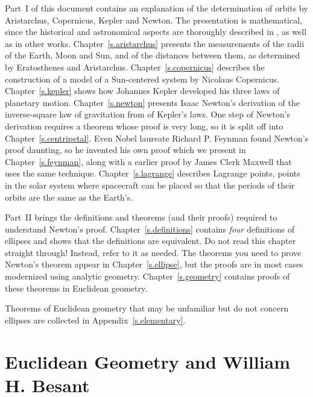 Part~I of this document contains an explanation of the determination of orbits by Aristarchus, Copernicus, Kepler and Newton. The presentation is mathematical, since the historical and astronomical aspects are thoroughly described in \cite{hahn-cic}, as well as in other works. Chapter~\ref{s.aristarchus} presents the measurements of the radii of the Earth, Moon and Sun, and of the distances between them, as determined by Eratosthenes and Aristarchus. Chapter~\ref{s.copernicus} describes the construction of a model of a Sun-centered system by Nicolaus Copernicus. Chapter~\ref{s.kepler} shows how Johannes Kepler developed his three laws of planetary motion. Chapter~\ref{s.newton} presents Isaac Newton's derivation of the inverse-square law of gravitation from of Kepler's laws. One step of Newton's derivation requires a theorem whose proof is very long, so it is split off into Chapter~\ref{s.centripetal}. Even Nobel laureate Richard P. Feynman found Newton's proof daunting, so he invented his own proof which we present in Chapter~\ref{s.feynman}, along with a earlier proof by James Clerk Maxwell that uses the same technique. Chapter~\ref{s.lagrange} describes Lagrange points, points in the solar system where spacecraft can be placed so that the periods of their orbits are the same as the Earth's.

Part~II brings the definitions and theorems (and their proofs) required to understand Newton's proof. Chapter~\ref{s.definitions} contains \emph{four} definitions of ellipses and shows that the definitions are equivalent. Do not read this chapter straight through! Instead, refer to it as needed. The theorems you need to prove Newton's theorem appear in Chapter~\ref{s.ellipse}, but the proofs are in most cases modernized using analytic geometry.  Chapter~\ref{s.geometry} contains proofs of these theorems in Euclidean geometry.

Theorems of Euclidean geometry that may be unfamiliar but do not concern ellipses are collected in Appendix~\ref{s.elementary}. 

\section*{Euclidean Geometry and William H. Besant}


